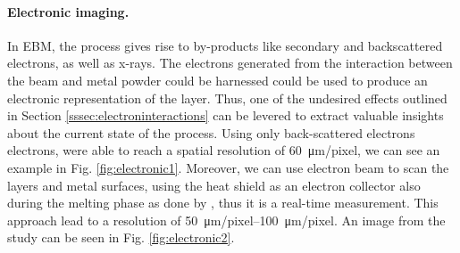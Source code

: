 \paragraph{Electronic imaging.} In EBM, the process gives rise to by-products like secondary and backscattered electrons, as well as x-rays. The electrons generated from the interaction between the beam and metal powder could be harnessed could be used to produce an electronic representation of the layer. Thus, one of the undesired effects outlined in Section \ref{sssec:electroninteractions} can be levered to extract valuable insights about the current state of the process. Using only back-scattered electrons electrons, \citeauthor{wong_pilot_2019} were able to reach a spatial resolution of \SI{60}{\micro\metre / pixel}, we can see an example in Fig. \ref{fig:electronic1}. Moreover, we can use electron beam to scan the layers and metal surfaces, using the heat shield as an electron collector also during the melting phase as done by \citeauthor{arnold_operando_2020}, thus it is a real-time measurement. This approach lead to a resolution of \SIrange[range-phrase=--]{50}{100}{\micro\metre / pixel}. An image from the study can be seen in Fig. \ref{fig:electronic2}.

